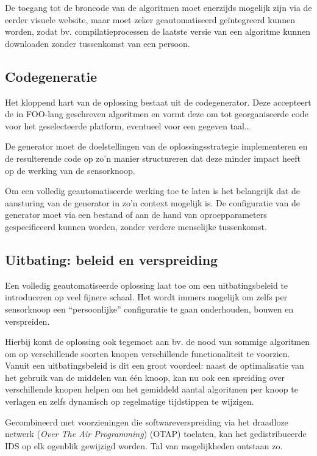 De toegang tot de broncode van de algoritmen moet enerzijds mogelijk zijn via
de eerder visuele website, maar moet zeker geautomatiseerd ge\"integreerd
kunnen worden, zodat bv. compilatieprocessen de laatste versie van een
algoritme kunnen downloaden zonder tussenkomst van een persoon.

\subsection{Codegeneratie}
\label{subsection:arch-codegen}

Het kloppend hart van de oplossing bestaat uit de codegenerator. Deze
accepteert de in FOO-lang geschreven algoritmen en vormt deze om tot
georganiseerde code voor het geselecteerde platform, eventueel voor een gegeven
taal\dots

De generator moet de doelstellingen van de oplossingsstrategie implementeren en
de resulterende code op zo'n manier structureren dat deze minder impact heeft
op de werking van de sensorknoop.

Om een volledig geautomatiseerde werking toe te laten is het belangrijk dat de
aansturing van de generator in zo'n context mogelijk is. De configuratie van de
generator moet via een bestand of aan de hand van oproepparameters
gespecificeerd kunnen worden, zonder verdere menselijke tussenkomst.

\subsection{Uitbating: beleid en verspreiding}
\label{subsection:arch-policy}

Een volledig geautomatiseerde oplossing laat toe om een uitbatingsbeleid te
introduceren op veel fijnere schaal. Het wordt immers mogelijk om zelfs per
sensorknoop een ``persoonlijke'' configuratie te gaan onderhouden, bouwen en
verspreiden.

Hierbij komt de oplossing ook tegemoet aan bv. de nood van sommige algoritmen
om op verschillende soorten knopen verschillende functionaliteit te voorzien.
Vanuit een uitbatingsbeleid is dit een groot voordeel: naast de optimalisatie
van het gebruik van de middelen van \'e\'en knoop, kan nu ook een spreiding
over verschillende knopen helpen om het gemiddeld aantal algoritmen per knoop
te verlagen en zelfs dynamisch op regelmatige tijdstippen te wijzigen.

Gecombineerd met voorzieningen die softwareverspreiding via het draadloze
netwerk (\emph{Over The Air Programming}) (OTAP) toelaten, kan het
gedistribueerde IDS op elk ogenblik gewijzigd worden. Tal van mogelijkheden
ontstaan zo.

